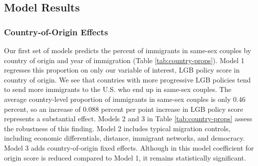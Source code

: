 \documentclass[
  11pt,
]{article}
\begin{document}
\hypertarget{model-results}{%
\subsection{Model Results}\label{model-results}}

\hypertarget{country-of-origin-effects}{%
\subsubsection{Country-of-Origin Effects}\label{country-of-origin-effects}}

Our first set of models predicts the percent of immigrants in same-sex couples by country of origin and year of immigration (Table \ref{tab:country-props}). Model 1 regresses this proportion on only our variable of interest, LGB policy score in country of origin. We see that countries with more progressive LGB policies tend to send more immigrants to the U.S. who end up in same-sex couples. The average country-level proportion of immigrants in same-sex couples is only 0.46 percent, so an increase of 0.088 percent per point increase in LGB policy score represents a substantial effect. Models 2 and 3 in Table \ref{tab:country-props} assess the robustness of this finding. Model 2 includes typical migration controls, including economic differentials, distance, immigrant networks, and democracy. Model 3 adds country-of-origin fixed effects. Although in this model coefficient for origin score is reduced compared to Model 1, it remains statistically significant.
\end{document}
